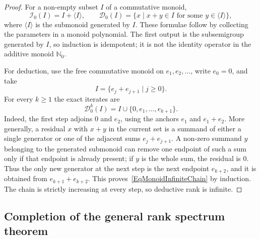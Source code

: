 \documentclass[12pt,english]{amsart}
\theoremstyle{definition}
\numberwithin{equation}{section}
\theoremstyle{remark}
\begin{document}
\begin{proof}
For a non-empty subset $I$ of a commutative monoid,
\[
\mathcal I_0(I)=I+\langle I\rangle,
\qquad
\mathcal D_0(I)=\{x\mid x+y\in I\text{ for some }y\in\langle I\rangle\},
\]
where $\langle I\rangle$ is the submonoid generated by $I$. These formulae follow by collecting the parameters in a monoid polynomial. The first output is the subsemigroup generated by $I$, so induction is idempotent; it is not the identity operator in the additive monoid $\mathbb N_0$.

For deduction, use the free commutative monoid on $e_1,e_2,\ldots$, write $e_0=0$, and take
\[
I=\{e_j+e_{j+1}\mid j\geqslant0\}.
\]
For every $k\geqslant1$ the exact iterates are
\begin{equation}\label{EqMonoidInfiniteChain}
\mathcal D_0^k(I)=I\cup\{0,e_1,\ldots,e_{k+1}\}.
\end{equation}
Indeed, the first step adjoins $0$ and $e_2$, using the anchors $e_1$ and $e_1+e_2$. More generally, a residual $x$ with $x+y$ in the current set is a summand of either a single generator or one of the adjacent sums $e_j+e_{j+1}$. A non-zero summand $y$ belonging to the generated submonoid can remove one endpoint of such a sum only if that endpoint is already present; if $y$ is the whole sum, the residual is $0$. Thus the only new generator at the next step is the next endpoint $e_{k+2}$, and it is obtained from $e_{k+1}+e_{k+2}$. This proves~\eqref{EqMonoidInfiniteChain} by induction. The chain is strictly increasing at every step, so deductive rank is infinite.
\end{proof}


\subsection{Completion of the general rank spectrum theorem}\label{SubsecCompleteRealization}
\end{document}
